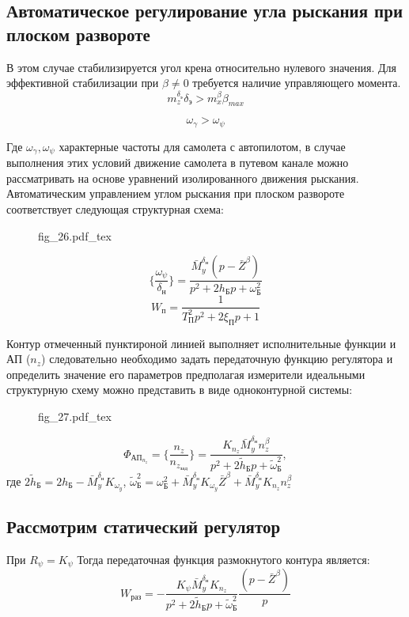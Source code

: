\documentclass{article}
\begin{document}
\subsection{Автоматическое регулирование угла рыскания при плоском развороте}
В этом случае стабилизируется угол крена относительно нулевого значения. Для эффективной стабилизации при $\beta \neq 0$ требуется наличие управляющего момента.
\[
m_z^{\delta_э} \delta_{э} > m_x^\beta \beta_{max}
\]

\[
\omega_{\gamma} > \omega_{\psi}
\]

Где $\omega_{\gamma}, \omega_{\psi}$ характерные частоты для самолета с автопилотом, в случае выполнения этих условий движение самолета в путевом канале можно рассматривать на основе уравнений изолированного движения рыскания. Автоматическим управлением углом рыскания при плоском развороте соответствует следующая структурная схема:

\begin{figure}[H]
\centering
{fig_26.pdf_tex}
\end{figure}

\[
\{\frac{\omega_{\psi}}{\delta_н}\} =\frac{\bar{M}_y^{\delta_{н}}(p - \bar{Z}^\beta)}{p^2 + 2h_Б p + \omega_Б^2} 
\]
\[
W_п = \frac{1}{T_П^2 p^2 + 2\xi_П p + 1}
\]

Контур отмеченный пунктироной линией выполняет исполнительные функции и АП ($n_z$) следовательно необходимо задать передаточную функцию регулятора и определить значение его параметров предполагая измерители идеальными структурную схему можно представить в виде одноконтурной системы:

\begin{figure}[H]
\centering
{fig_27.pdf_tex}
\end{figure}


\[
\Phi_{АП_{n_z}} = \{\frac{n_z}{n_{z_{зад}}} \} =\frac{K_{n_z}\bar{M}_y^{\delta_н} n_z^\beta}{p^2 + 2 \tilde{h}_Б p + \tilde{\omega}_{Б}^2},
\]
где $2\tilde{h}_Б = 2h_Б -\bar{M}_y^{\delta_н} K_{{\omega}_y}$, $\tilde{\omega}_Б^2 = \omega_Б^2 +\bar{M}_y^{\delta_н}K_{\omega_y}\bar{Z}^\beta + \bar{M}_y^{\delta_н} K_{n_z}n_z^\beta$

\subsection{Рассмотрим статический регулятор}
При $R_\psi = K_\psi$
Тогда передаточная функция размокнутого контура является:
\[
W_{раз} = -\frac{K_{\psi} \bar{M}_y^{\delta_н} K_{n_z}}{p^2 + 2 \tilde{h}_Б p + \tilde{\omega}_{Б}^2} \frac{(p - \bar{Z}^\beta)}{p}  
\]
\end{document}
